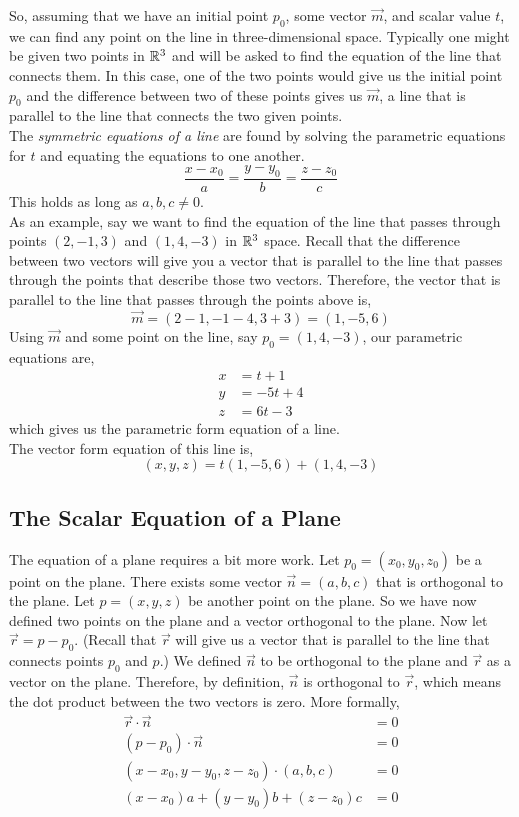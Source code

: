 \documentclass[12pt]{article}
\begin{document}
So, assuming that we have an initial point $p_0$, some vector $\vec{m}$, and scalar value $t$, we can find any point on the line in three-dimensional space. Typically one might be given two points in $\mathbb{R}^3$ and will be asked to find the equation of the line that connects them. In this case, one of the two points would give us the initial point $p_0$ and the difference between two of these points gives us $\vec{m}$, a line that is parallel to the line that connects the two given points. \\

 The \emph{symmetric equations of a line} are found by solving the parametric equations for $t$ and equating the equations to one another. 
\[
\frac{x-x_0}{a}=\frac{y-y_0}{b}=\frac{z-z_0}{c}
\]
This holds as long as $a,b,c\neq0$.\\

 As an example, say we want to find the equation of the line that passes through points $(2,-1,3)$ and $(1,4,-3)$ in $\mathbb{R}^3$ space. Recall that the difference between two vectors will give you a vector that is parallel to the line that passes through the points that describe those two vectors. Therefore, the vector that is parallel to the line that passes through the points above is,
\[
\vec{m} = (2-1,-1-4,3+3) = (1,-5,6)
\]
Using $\vec{m}$ and some point on the line, say $p_0=(1,4,-3)$, our parametric equations are,
\begin{align*}
x &= t + 1\\
y &= -5t + 4\\
z &= 6t - 3
\end{align*}
which gives us the parametric form equation of a line.\\

The vector form equation of this line is,
\[
(x,y,z) = t(1,-5,6) + (1,4,-3)
\]

\subsection{The Scalar Equation of a Plane}

The equation of a plane requires a bit more work. Let $p_0=(x_0,y_0,z_0)$ be a point on the plane. There exists some vector $\vec{n}=(a,b,c)$ that is orthogonal to the plane. Let $p=(x,y,z)$ be another point on the plane. So we have now defined two points on the plane and a vector orthogonal to the plane. Now let $\vec{r}=p-p_0$. (Recall that $\vec{r}$ will give us a vector that is parallel to the line that connects points $p_0$ and $p$.) We defined $\vec{n}$ to be orthogonal to the plane and $\vec{r}$ as a vector on the plane. Therefore, by definition, $\vec{n}$ is orthogonal to $\vec{r}$, which means the dot product between the two vectors is zero. More formally,
\begin{align*}
\vec{r}\cdot\vec{n} &= 0 \\
(p-p_0)\cdot \vec{n} &=0 \\
(x-x_0,y-y_0,z-z_0) \cdot (a,b,c) &= 0 \\
(x-x_0)a + (y-y_0)b + (z-z_0)c &= 0 
\end{align*}
\end{document}
